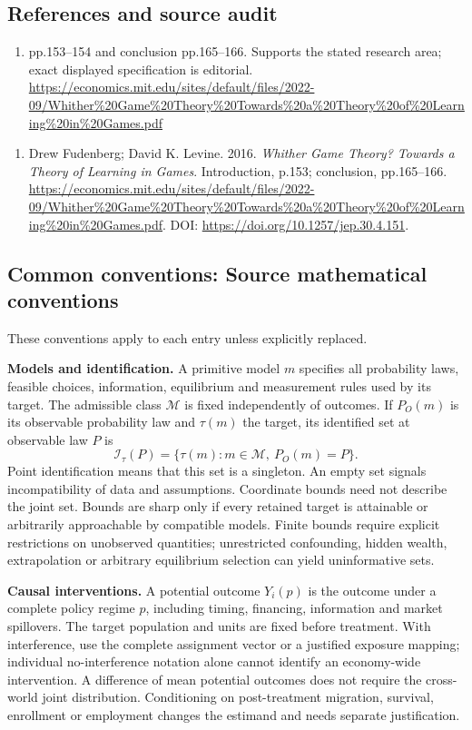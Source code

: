\documentclass[11pt,a4paper]{article}
\begin{document}
\subsection*{References and source audit}
\begin{enumerate}
\item pp.153–154 and conclusion pp.165–166. Supports the stated research area; exact displayed specification is editorial. \url{https://economics.mit.edu/sites/default/files/2022-09/Whither%20Game%20Theory%20Towards%20a%20Theory%20of%20Learning%20in%20Games.pdf}
\end{enumerate}
\begin{enumerate}\raggedright
\item\hypertarget{definitions:source:30007563:1}{} Drew Fudenberg; David K. Levine. 2016. \emph{Whither Game Theory? Towards a Theory of Learning in Games}. Introduction, p.153; conclusion, pp.165–166.
\url{https://economics.mit.edu/sites/default/files/2022-09/Whither%20Game%20Theory%20Towards%20a%20Theory%20of%20Learning%20in%20Games.pdf}.
DOI: \url{https://doi.org/10.1257/jep.30.4.151}.
\end{enumerate}

\subsection*{Common conventions: Source mathematical conventions}

These conventions apply to each entry unless explicitly replaced.

\textbf{Models and identification.} A primitive model \(m\) specifies all probability laws, feasible choices, information, equilibrium and measurement rules used by its target. The admissible class \(\mathcal M\) is fixed independently of outcomes. If \(P_O(m)\) is its observable probability law and \(\tau(m)\) the target, its identified set at observable law \(P\) is
\[
 \mathcal I_\tau(P)=\{\tau(m):m\in\mathcal M,\ P_O(m)=P\}.
\]
Point identification means that this set is a singleton. An empty set signals incompatibility of data and assumptions. Coordinate bounds need not describe the joint set. Bounds are sharp only if every retained target is attainable or arbitrarily approachable by compatible models. Finite bounds require explicit restrictions on unobserved quantities; unrestricted confounding, hidden wealth, extrapolation or arbitrary equilibrium selection can yield uninformative sets.

\textbf{Causal interventions.} A potential outcome \(Y_i(p)\) is the outcome under a complete policy regime \(p\), including timing, financing, information and market spillovers. The target population and units are fixed before treatment. With interference, use the complete assignment vector or a justified exposure mapping; individual no-interference notation alone cannot identify an economy-wide intervention. A difference of mean potential outcomes does not require the cross-world joint distribution. Conditioning on post-treatment migration, survival, enrollment or employment changes the estimand and needs separate justification.
\end{document}
